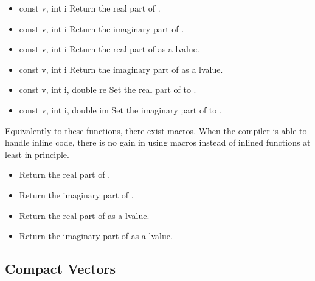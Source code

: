 \begin{itemize}
\item {}
  {const \PnlVectComplex \ptr v, int i}
  \sshortdescribe Return the real part of .
  
\item {}
  {const \PnlVectComplex \ptr v, int i}
  \sshortdescribe Return the imaginary part of .

\item {}
  {const \PnlVectComplex \ptr v, int i}
  \sshortdescribe Return the real part of  as a lvalue.

\item {}
  {const \PnlVectComplex \ptr v, int i}
  \sshortdescribe Return the imaginary part of  as a lvalue.

\item {}
  {const \PnlVectComplex \ptr v, int i, double re}
  \sshortdescribe Set the real part of  to .

\item {}
  {const \PnlVectComplex \ptr v, int i, double im}
  \sshortdescribe Set the imaginary part of  to .
\end{itemize}

Equivalently to these functions, there exist macros. When the compiler is able
to handle inline code, there is no gain in using macros instead of inlined
functions at least in principle.
\begin{itemize}
\item {}
  \sshortdescribe Return the real part of .
  
\item {}
  \sshortdescribe Return the imaginary part of .
  
\item {}
  \sshortdescribe Return the real part of  as a lvalue.
  
\item {}
  \sshortdescribe Return the imaginary part of  as a lvalue.
\end{itemize}

\subsection{Compact Vectors}
